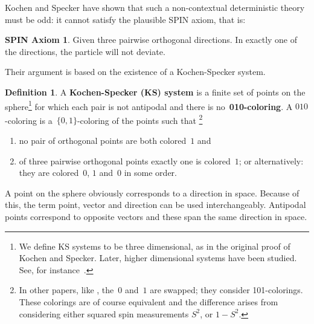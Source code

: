 \documentclass[adraft,copyright,creativecommons]{eptcs}
\newcommand{\keyword}[1]{\textbf{#1}}
\newcounter{main}
\theoremstyle{definition}
\newtheorem{dfn}[main]{Definition}
\newtheorem*{spin}{SPIN Axiom \cite{ck09}}
\theoremstyle{remark}
\begin{document}
Kochen and Specker have shown that such a non-contextual deterministic
theory must be odd: it cannot satisfy the plausible SPIN
axiom, that is:
\begin{spin}
    Given three pairwise orthogonal directions.
    In exactly one of the directions, the particle will not deviate.
\end{spin}
Their argument is based on the existence of a Kochen-Specker system.
\begin{dfn}
    A \keyword{Kochen-Specker (KS) system} is
    a finite set of points on the sphere\footnote{
            We define KS systems to be three dimensional,
            as in the original proof of Kochen and Specker.
            Later, higher dimensional systems have been studied.
            See, for instance~\cite[p.~201]{qtcm}.
        }
    for which each pair is not antipodal and
    there is no~\keyword{010-coloring}.
    A $010$-coloring is a~$\{0,1\}$-coloring of the points such that%
        \footnote{
                In other papers, like \cite{aow11},
                the~$0$ and~$1$ are swapped; they consider 101-colorings.
                These colorings are of course equivalent and the
                difference arises from considering either squared
                spin measurements $S^2$, or $1-S^2$.
               	}
    \begin{enumerate}
        \item
            no pair of orthogonal points are both colored~$1$ and
        \item
            of three pairwise orthogonal points exactly one is colored~$1$;
            or alternatively: they are colored~$0$, $1$ and~$0$ in some order.
    \end{enumerate}
\end{dfn}
A point on the sphere obviously corresponds to a direction in space.
Because of this, the term point, vector and direction
can be used interchangeably. Antipodal points correspond to opposite
vectors and these span the same direction in space.
\end{document}

